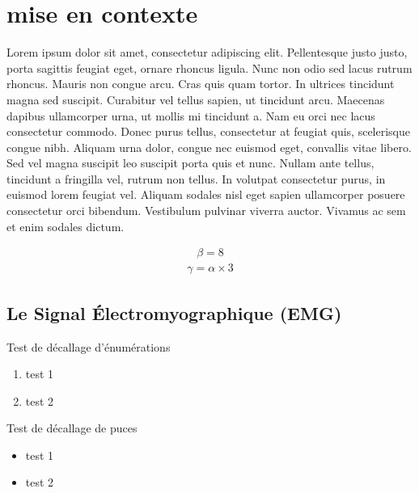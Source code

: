 \documentclass[letterpaper, twoside, 12pt, memoire, creativecommons, hyperref]{thETS}
\begin{document}
%
%

\chapter{mise en contexte}

Lorem ipsum dolor sit amet, consectetur adipiscing elit. Pellentesque justo justo, porta sagittis feugiat eget, ornare rhoncus ligula. Nunc non odio sed lacus rutrum rhoncus. Mauris non congue arcu. Cras quis quam tortor. In ultrices tincidunt magna sed suscipit. Curabitur vel tellus sapien, ut tincidunt arcu. Maecenas dapibus ullamcorper urna, ut mollis mi tincidunt a. Nam eu orci nec lacus consectetur commodo. Donec purus tellus, consectetur at feugiat quis, scelerisque congue nibh. Aliquam urna dolor, congue nec euismod eget, convallis vitae libero. Sed vel magna suscipit leo suscipit porta quis et nunc. Nullam ante tellus, tincidunt a fringilla vel, rutrum non tellus. In volutpat consectetur purus, in euismod lorem feugiat vel. Aliquam sodales nisl eget sapien ullamcorper posuere consectetur orci bibendum. Vestibulum pulvinar viverra auctor. Vivamus ac sem et enim sodales dictum.

\begin{align}
   \beta = 8
\end{align}
\begin{align}
   \gamma = \alpha \times 3
\end{align}


\section{Le Signal Électromyographique (EMG)}

Test de décallage d'énumérations
\begin{enumerate}
 \item test 1
 \item test 2
\end{enumerate}

Test de décallage de puces

\begin{itemize}
 \item test 1
 \item test 2
\end{itemize}
\end{document}
